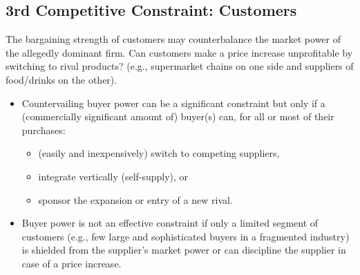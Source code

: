 \newpage
    \subsection{3rd Competitive Constraint: Customers}

        The bargaining strength of customers may counterbalance the market power of the allegedly dominant firm. Can customers make a price increase unprofitable by switching to rival products? (e.g., supermarket chains on one side and suppliers of food/drinks on the other).
        
        \begin{itemize}
            \item Countervailing buyer power can be a significant constraint but only if a (commercially significant amount of) buyer(s) can, for all or most of their purchases:
            \begin{itemize}
                \item (easily and inexpensively) switch to competing suppliers,
                \item integrate vertically (self-supply), or
                \item sponsor the expansion or entry of a new rival.
            \end{itemize}
            \item Buyer power is not an effective constraint if only a limited segment of customers (e.g., few large and sophisticated buyers in a fragmented industry) is shielded from the supplier’s market power or can discipline the supplier in case of a price increase.
        \end{itemize}



